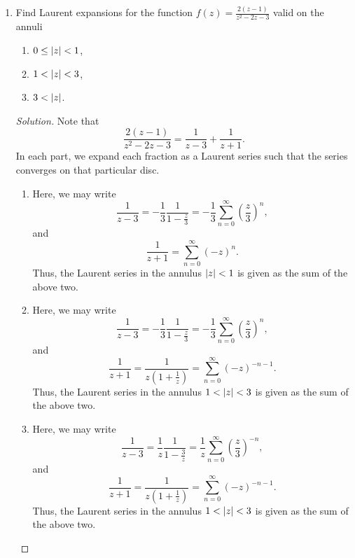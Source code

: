 \documentclass[11pt]{article}
\theoremstyle{definition}
\newenvironment{soln}{\begin{proof}[Solution]}{\end{proof}}
\begin{document}
\begin{enumerate}[leftmargin=*]
    \item Find Laurent expansions for the function $\displaystyle f(z) = \frac{2(z-1)}{z^2-2z-3}$ valid on the annuli
    \begin{enumerate}
        \item $0 \leq \abs{z} < 1$,
        \item $1 < \abs{z} < 3$,
        \item $3 < \abs{z}$.
    \end{enumerate}
    
    \begin{soln}
        Note that 
        \[
            \frac{2(z-1)}{z^2 - 2z - 3} = \frac{1}{z-3} + \frac{1}{z+1}.
        \]
        In each part, we expand each fraction as a Laurent series such that the series converges on that particular disc. 
        
        \begin{enumerate}
            \item Here, we may write
            \[
                \frac{1}{z-3} = -\frac{1}{3}\frac{1}{1-\frac{z}{3}} = -\frac{1}{3} \sum_{n=0}^{\infty} \left( \frac{z}{3} \right)^n,
            \]
            and
            \[
                \frac{1}{z+1} = \sum_{n=0}^{\infty} (-z)^n.
            \]
            Thus, the Laurent series in the annulus $\abs{z} < 1$ is given as the sum of the above two.
            
            \item Here, we may write
            \[
                \frac{1}{z-3} = -\frac{1}{3}\frac{1}{1-\frac{z}{3}} = -\frac{1}{3} \sum_{n=0}^{\infty} \left( \frac{z}{3} \right)^n,
            \]
            and
            \[
                \frac{1}{z+1} = \frac{1}{z\left( 1 + \frac{1}{z} \right)} = \sum_{n=0}^{\infty} (-z)^{-n-1}.
            \]
            Thus, the Laurent series in the annulus $1 < \abs{z} < 3$ is given as the sum of the above two.
            
            \item Here, we may write
            \[
                \frac{1}{z-3} = \frac{1}{z}\frac{1}{1-\frac{3}{z}} = \frac{1}{z}\sum_{n=0}^{\infty} \left( \frac{z}{3} \right)^{-n},
            \]
            and
            \[
                \frac{1}{z+1} = \frac{1}{z\left( 1 + \frac{1}{z} \right)} = \sum_{n=0}^{\infty} (-z)^{-n-1}.
            \]
            Thus, the Laurent series in the annulus $1 < \abs{z} < 3$ is given as the sum of the above two.
        \end{enumerate}
    \end{soln}
    

\end{enumerate}
\end{document}
